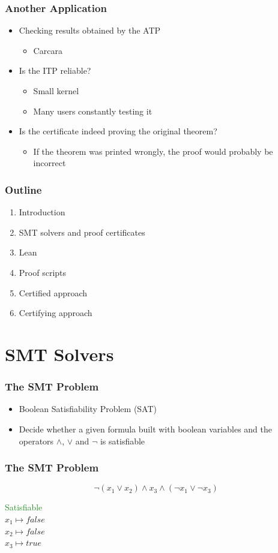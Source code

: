 \documentclass[usepdftitle=false,aspectratio=169,usenames,dvipsnames]{beamer}
\newcommand{\bluecheck}{{\color{blue}\checkmark}}
\newcommand\vitem{\vfill\item}
\begin{document}
\begin{frame}
  \frametitle{Another Application}
  \begin{itemize}
    \item Checking results obtained by the ATP
    \begin{itemize}
      \item Carcara
    \end{itemize}
    \vitem Is the ITP reliable?
    \begin{itemize}
      \item Small kernel
      \item Many users constantly testing it
    \end{itemize}
    \vitem Is the certificate indeed proving the original theorem?
    \begin{itemize}
        \item If the theorem was printed wrongly, the proof would probably be incorrect
    \end{itemize}
  \end{itemize}
\end{frame}



\begin{frame}
  \frametitle{Outline}
  \begin{enumerate}
    \item Introduction \bluecheck
    \vitem SMT solvers and proof certificates
    \vitem Lean
    \vitem Proof scripts
    \vitem Certified approach
    \vitem Certifying approach
  \end{enumerate}
\end{frame}

\section{SMT Solvers}

\begin{frame}
  \frametitle{The SMT Problem}
  \begin{itemize}
    \item Boolean Satisfiability Problem (SAT)
    \vitem Decide whether a given formula built with boolean variables and the operators $\wedge$, $\vee$ and $\neg$ is satisfiable
  \end{itemize}
\end{frame}


\begin{frame}
  \frametitle{The SMT Problem}
  \begin{overprint}
    \medskip
    $$\neg (x_{1} \vee x_{2}) \wedge x_{3} \wedge (\neg x_{1} \vee \neg x_{3})$$
  \end{overprint}
  \vfill
  \begin{overprint}
    \begin{center}
      \textcolor{ForestGreen}{Satisfiable}\\
    $x_{1} \mapsto false$ \\
    $x_{2} \mapsto false$ \\
    $x_{3} \mapsto true$
    \end{center}
  \end{overprint}
\end{frame}
\end{document}
